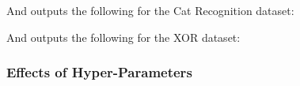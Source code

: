 \documentclass[./project-report/src/latex/project-report.tex]{subfiles}
\begin{document}
And outputs the following for the Cat Recognition dataset:

\pagebreak

\begin{figure}[h!]
\centering
{}
\end{figure}

And outputs the following for the XOR dataset:

\pagebreak

\begin{figure}[h!]
\centering
{}
\end{figure}

\subsubsection{Effects of Hyper-Parameters}
\label{sec:effects-of-hyper-parameters}
\end{document}
